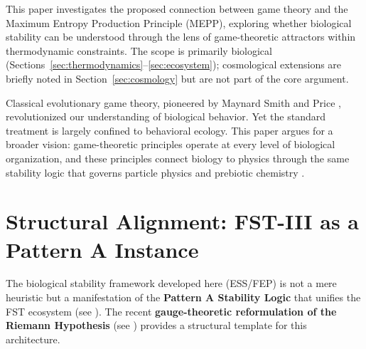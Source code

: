 \documentclass[12pt,a4paper]{article}
\theoremstyle{remark}
\begin{document}
This paper investigates the proposed connection between game theory and the Maximum Entropy Production Principle (MEPP), exploring whether biological stability can be understood through the lens of game-theoretic attractors within thermodynamic constraints. The scope is primarily biological (Sections~\ref{sec:thermodynamics}--\ref{sec:ecosystem}); cosmological extensions are briefly noted in Section~\ref{sec:cosmology} but are not part of the core argument.

Classical evolutionary game theory, pioneered by Maynard Smith and Price \citep{MaynardSmith1982}, revolutionized our understanding of biological behavior. Yet the standard treatment is largely confined to behavioral ecology. This paper argues for a broader vision: game-theoretic principles operate at every level of biological organization, and these principles connect biology to physics through the same stability logic that governs particle physics \citep{FSTI} and prebiotic chemistry \citep{FSTII}.

\section{Structural Alignment: FST-III as a Pattern A Instance}
\label{sec:structural-alignment}

The biological stability framework developed here (ESS/FEP) is not a mere heuristic but a manifestation of the \textbf{Pattern A Stability Logic} that unifies the FST ecosystem (see \cite{FST-Unified2026}). The recent \textbf{gauge-theoretic reformulation of the Riemann Hypothesis} (see \cite{GeigerRH2026c}) provides a structural template for this architecture.
\end{document}
